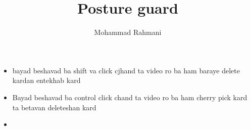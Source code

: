 \documentclass[a4paper]{article}
\title{Posture guard}
\date{}
\author{Mohammad Rahmani}
\begin{document}
\maketitle

\begin{itemize}
    \item bayad beshavad ba shift  va click cjhand ta video ro ba ham baraye delete kardan entekhab kard
    \item Bayad beshavad ba control click chand ta video ro ba ham cherry pick kard ta betavan deleteshan kard
    \item 
\end{itemize}



\end{document}
